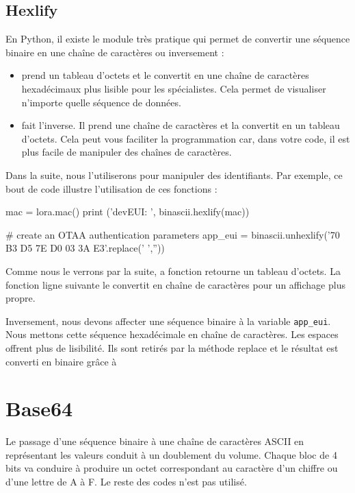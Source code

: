 \subsection*{Hexlify}

En Python, il existe le module  très pratique qui permet de convertir une séquence binaire en une chaîne de caractères ou inversement :
\begin{itemize}
\item {} prend un tableau d'octets et le convertit en une chaîne de caractères hexadécimaux plus lisible pour les spécialistes. Cela permet de visualiser n'importe quelle séquence de données. 
\item {} fait l'inverse. Il prend une chaîne de caractères et la convertit en un tableau d'octets. Cela peut vous faciliter la programmation car, dans votre code, il est plus facile de manipuler des chaînes de caractères.

\end{itemize}
Dans la suite, nous l'utiliserons pour manipuler des identifiants. Par exemple, ce bout de code illustre l'utilisation de ces fonctions :

\begin{python}
mac = lora.mac()
print ('devEUI: ',  binascii.hexlify(mac))

# create an OTAA authentication parameters
app_eui = binascii.unhexlify('70 B3 D5 7E D0 03 3A E3'.replace(' ',''))

\end{python}

Comme nous le verrons par la suite, a fonction  retourne un tableau d'octets. La fonction  ligne suivante le convertit en chaîne de caractères pour un affichage plus propre. 

Inversement, nous devons affecter une séquence binaire à la variable \texttt{app\_eui}. Nous mettons cette séquence hexadécimale en chaîne de caractères. Les espaces offrent plus de lisibilité. Ils sont retirés par la méthode replace et le résultat est converti en binaire grâce à 

\section{Base64}

Le passage d'une séquence binaire à une chaîne de caractères ASCII en représentant les valeurs conduit à un doublement du volume. Chaque bloc de 4 bits va conduire à produire un octet correspondant au caractère d'un chiffre ou d'une lettre de A à F. Le reste des codes n'est pas utilisé.

